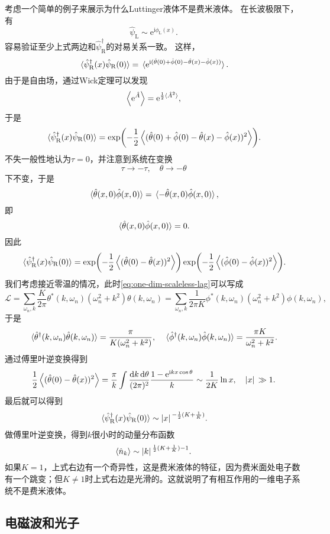 \documentclass[hyperref, UTF8, a4paper]{ctexart}
\newcommand*{\ii}{\mathrm{i}}
\newcommand*{\ee}{\mathrm{e}}
\begin{document}
考虑一个简单的例子来展示为什么Luttinger液体不是费米液体。
在长波极限下，有
\begin{equation}
    \hat{\psi}_\text{L} \sim \ee^{\ii \phi_\text{L}(x)}.
\end{equation}
容易验证至少上式两边和$\hat{\psi}^\dagger_\text{R}$的对易关系一致。
这样，
\[
    \expval*{\hat{\psi}_\text{R}^\dagger(x) \hat{\psi}_\text{R}(0)} = \expval*{\ee^{\ii (\hat{\theta}(0) + \hat{\phi}(0) - \hat{\theta}(x) - \hat{\phi}(x))}}.
\]
由于是自由场，通过Wick定理可以发现
\[
    \expval{\ee^{\hat{A}}} = \ee^{\frac{1}{2} \expval*{\hat{A}^2}},
\]
于是
\[
    \expval*{\hat{\psi}_\text{R}^\dagger(x) \hat{\psi}_\text{R}(0)} = \exp(- \frac{1}{2} \expval{(\hat{\theta}(0) + \hat{\phi}(0) - \hat{\theta}(x) - \hat{\phi}(x))^2}).
\]
不失一般性地认为$\tau=0$，并注意到系统在变换
\[
    \tau \longrightarrow - \tau, \quad \theta \longrightarrow -\theta
\]
下不变，于是
\[
    \expval*{\hat{\theta}(x, 0) \hat{\phi}(x, 0)} = \expval*{- \hat{\theta}(x, 0) \hat{\phi}(x, 0)},
\]
即
\[
    \expval*{\hat{\theta}(x, 0) \hat{\phi}(x, 0)} = 0.
\]
因此
\[
    \expval*{\hat{\psi}_\text{R}^\dagger(x) \hat{\psi}_\text{R}(0)} = \exp(- \frac{1}{2} \expval{(\hat{\theta}(0) - \hat{\theta}(x))^2}) \exp(- \frac{1}{2} \expval{(\hat{\phi}(0) - \hat{\phi}(x))^2}).
\]
我们考虑接近零温的情况，此时\eqref{eq:one-dim-scaleless-lag}可以写成
\[
    \mathcal{L} = \sum_{\omega_n, k} \frac{K}{2\pi} \theta^*(k, \omega_n) (\omega_n^2 + k^2) \theta(k, \omega_n) = \sum_{\omega_n, k} \frac{1}{2\pi K} \phi^*(k, \omega_n) (\omega_n^2 + k^2) \phi(k, \omega_n),
\]
于是
\[
    \expval*{\hat{\theta}^\dagger(k, \omega_n) \hat{\theta}(k, \omega_n)} = \frac{\pi}{K (\omega_n^2 + k^2)}, \quad \expval*{\hat{\phi}^\dagger(k, \omega_n) \hat{\phi}(k, \omega_n)} = \frac{\pi K}{\omega_n^2 + k^2}.
\]
通过傅里叶逆变换得到
\[
    \frac{1}{2} \expval{(\hat{\theta}(0) - \hat{\theta}(x))^2} = \frac{\pi}{k} \int \frac{\dd{k} \dd{\theta}}{(2\pi)^2} \frac{1 - \ee^{\ii k x \cos \theta}}{k} \sim \frac{1}{2K} \ln x, \quad \abs*{x} \gg 1.
\]
最后就可以得到
\[
    \expval*{\hat{\psi}_\text{R}^\dagger(x) \hat{\psi}_\text{R}(0)} \sim \abs*{x}^{-\frac{1}{2}(K + \frac{1}{K})}.
\]
做傅里叶逆变换，得到$k$很小时的动量分布函数
\[
    \expval{\hat{n}_k} \sim \abs*{k}^{\frac{1}{2}(K + \frac{1}{K}) - 1}.
\]
如果$K=1$，上式右边有一个奇异性，这是费米液体的特征，因为费米面处电子数有一个跳变；但$K \neq 1$时上式右边是光滑的。这就说明了有相互作用的一维电子系统不是费米液体。

\subsection{电磁波和光子}
\end{document}

